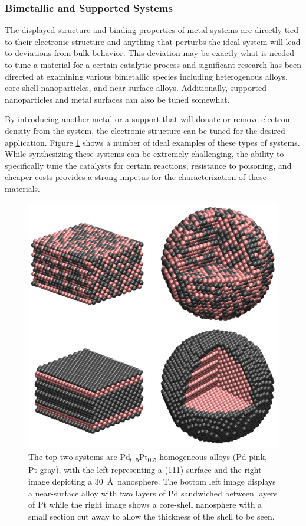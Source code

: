 \subsubsection{Bimetallic and Supported Systems}
The displayed structure and binding properties of metal systems are directly
tied to their electronic structure and anything that perturbs the ideal system
will lead to deviations from bulk behavior. This deviation may be exactly what
is needed to tune a material for a certain catalytic process and significant
research has been directed at examining various bimetallic species including
heterogenous alloys, core-shell nanoparticles, and near-surface alloys.
Additionally, supported nanoparticles and metal surfaces can also be tuned
somewhat. 

By introducing another metal or a support that will donate or remove electron
density from the system, the electronic structure can be tuned for the desired
application. Figure \ref{fig:bimetallic} shows a number of ideal examples of
these types of systems. While synthesizing these systems can be extremely
challenging, the ability to specifically tune the catalysts for certain
reactions, resistance to poisoning\citep{Sharma:0ly, Yu:2013fr}, and cheaper
costs\citep{Li:0hl, Zhao:0qf} provides a strong impetus for the characterization
of these materials.

\begin{figure}[p!]
  \includegraphics[width=\linewidth]{../figures/chap1/bimetallic.pdf}
\caption{The top two systems are Pd\textsubscript{0.5}Pt\textsubscript{0.5}
homogeneous alloys (Pd pink, Pt gray), with the left representing a (111) surface
and the right image depicting a 30~\AA\ nanosphere. The bottom left image
displays a near-surface alloy with two layers of Pd sandwiched between layers of
Pt while the right image shows a core-shell nanosphere with a small section cut
away to allow the thickness of the shell to be seen.}
\label{fig:bimetallic} 
\end{figure}

